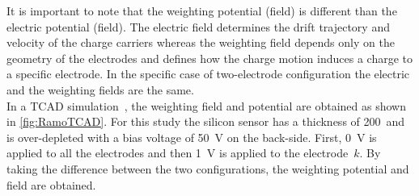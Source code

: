  It is important to note that the weighting potential (field) is
 different than the electric potential (field). The electric field
 determines the drift trajectory and velocity of the charge carriers
 whereas the weighting field depends only on the geometry of the
 electrodes and defines how the charge motion induces a charge to a
 specific electrode. In the specific case of two-electrode configuration the
 electric and the weighting fields are the same. \\
In a TCAD simulation~\cite{synopsysTCAD}, the weighting field and potential are obtained
as shown in \cref{fig:RamoTCAD}. For this study the silicon
sensor has a thickness of 200~\micron and is over-depleted with a bias
voltage of \SI{50}{\volt} on the back-side. First, \SI{0}{\volt} is
applied to all the electrodes and then \SI{1}{\volt} is applied to the
electrode~$k$. By taking the difference between the two
configurations, the weighting potential and field are obtained.


